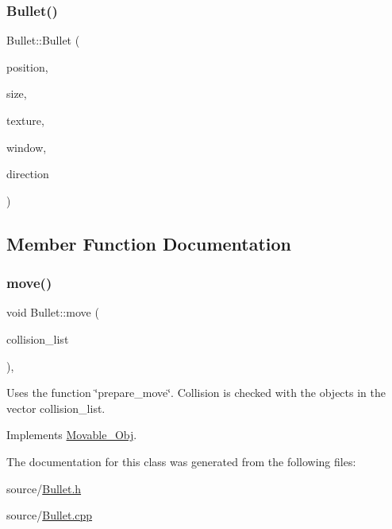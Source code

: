 \subsubsection{\texorpdfstring{Bullet()}{Bullet()}}
{\footnotesize\ttfamily Bullet\+::\+Bullet (\begin{DoxyParamCaption}\item[{std\+::shared\+\_\+ptr$<$ sf\+::\+Vector2f $>$}]{position,  }\item[{std\+::shared\+\_\+ptr$<$ sf\+::\+Vector2f $>$}]{size,  }\item[{std\+::shared\+\_\+ptr$<$ sf\+::\+Texture $>$}]{texture,  }\item[{sf\+::\+Render\+Window $\ast$}]{window,  }\item[{std\+::string}]{direction }\end{DoxyParamCaption})}



\subsection{Member Function Documentation}
\mbox{\label{classBullet_a00c0fec9c45ab1ab2b5883404d1bda62}} 
\subsubsection{\texorpdfstring{move()}{move()}}
{\footnotesize\ttfamily void Bullet\+::move (\begin{DoxyParamCaption}\item[{std\+::vector$<$ std\+::shared\+\_\+ptr$<$ \hyperlink{classObject}{Object} $>$$>$}]{collision\+\_\+list }\end{DoxyParamCaption})\hspace{0.3cm}{\ttfamily [override]}, {\ttfamily [virtual]}}

Uses the function \char`\"{}prepare\+\_\+move\char`\"{}. Collision is checked with the objects in the vector collision\+\_\+list. 

Implements \hyperlink{classMovable__Obj_a7bc9fbcd4dede97c2fae66c0502c8ead}{Movable\+\_\+\+Obj}.



The documentation for this class was generated from the following files\+:\begin{DoxyCompactItemize}
\item 
source/\hyperlink{Bullet_8h}{Bullet.\+h}\item 
source/\hyperlink{Bullet_8cpp}{Bullet.\+cpp}\end{DoxyCompactItemize}

